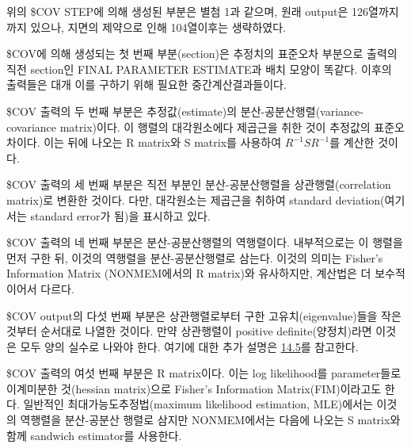 \documentclass[
  10pt,
  krantz2,
  a4paper]{krantz}
\theoremstyle{definition}
\theoremstyle{definition}
\theoremstyle{definition}
\theoremstyle{remark}
\begin{document}
위의 \$COV STEP에 의해 생성된 부분은 별첨 1과 같으며, 원래 output은 126열까지까지 있으나, 지면의 제약으로 인해 104열이후는 생략하였다.

\$COV에 의해 생성되는 첫 번째 부분(section)은 추정치의 표준오차 부분으로 출력의 직전 section인 FINAL PARAMETER ESTIMATE과 배치 모양이 똑같다. 이후의 출력들은 대개 이를 구하기 위해 필요한 중간계산결과들이다.

\$COV 출력의 두 번째 부분은 추정값(estimate)의 분산-공분산행렬(variance-covariance matrix)이다. 이 행렬의 대각원소에다 제곱근을 취한 것이 추정값의 표준오차이다. 이는 뒤에 나오는 R matrix와 S matrix를 사용하여 \(R^{- 1}SR^{- 1}\)를 계산한 것이다.

\$COV 출력의 세 번째 부분은 직전 부분인 분산-공분산행렬을 상관행렬(correlation matrix)로 변환한 것이다. 다만, 대각원소는 제곱근을 취하여 standard deviation(여기서는 standard error가 됨)을 표시하고 있다.

\$COV 출력의 네 번째 부분은 분산-공분산행렬의 역행렬이다. 내부적으로는 이 행렬을 먼저 구한 뒤, 이것의 역행렬을 분산-공분산행렬로 삼는다. 이것의 의미는 Fisher's Information Matrix (NONMEM에서의 R matrix)와 유사하지만, 계산법은 더 보수적이어서 다르다.

\$COV output의 다섯 번째 부분은 상관행렬로부터 구한 고유치(eigenvalue)들을 작은 것부터 순서대로 나열한 것이다. 만약 상관행렬이 positive definite(양정치)라면 이것은 모두 양의 실수로 나와야 한다. 여기에 대한 추가 설명은 \protect\hyperlink{Theoph}{14.5}를 참고한다.

\$COV 출력의 여섯 번째 부분은 R matrix이다. 이는 log likelihood를 parameter들로 이계미분한 것(hessian matrix)으로 Fisher's Information Matrix(FIM)이라고도 한다. 일반적인 최대가능도추정법(maximum likelihood estimation, MLE)에서는 이것의 역행렬을 분산-공분산 행렬로 삼지만 NONMEM에서는 다음에 나오는 S matrix와 함께 sandwich estimator를 사용한다.
\end{document}
